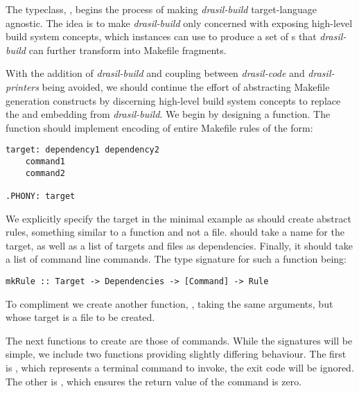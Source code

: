 {{{{{The typeclass, , begins the process of making \textit{drasil-build} target-language agnostic. The idea is to make \textit{drasil-build} only concerned with exposing high-level build system concepts, which  instances can use to produce a set of s that \textit{drasil-build} can further transform into Makefile fragments. 

With the addition of \textit{drasil-build} and coupling between \textit{drasil-code} and \textit{drasil-printers} being avoided, we should continue the effort of abstracting Makefile generation constructs by discerning high-level build system concepts to replace the  and  embedding from \textit{drasil-build}. We begin by designing a  function. The function should implement encoding of entire Makefile rules of the form:

\begin{tcolorbox}
\begin{verbatim}
target: dependency1 dependency2
	command1
	command2

.PHONY: target
\end{verbatim}
\end{tcolorbox}

We explicitly specify the  target in the minimal example as  should create abstract rules, something similar to a function and not a file.  should take a name for the target, as well as a list of targets and files as dependencies. Finally, it should take a list of command line commands. The type signature for such a function being:

\begin{tcolorbox}
\begin{verbatim}
mkRule :: Target -> Dependencies -> [Command] -> Rule
\end{verbatim}
\end{tcolorbox}

To compliment  we create another function, , taking the same arguments, but whose target is a file to be created.

The next functions to create are those of commands. While the signatures will be simple, we include two functions providing slightly differing behaviour. The first is , which represents a terminal command to invoke, the exit code will be ignored. The other is , which ensures the return value of the command is zero.

}}}}}
